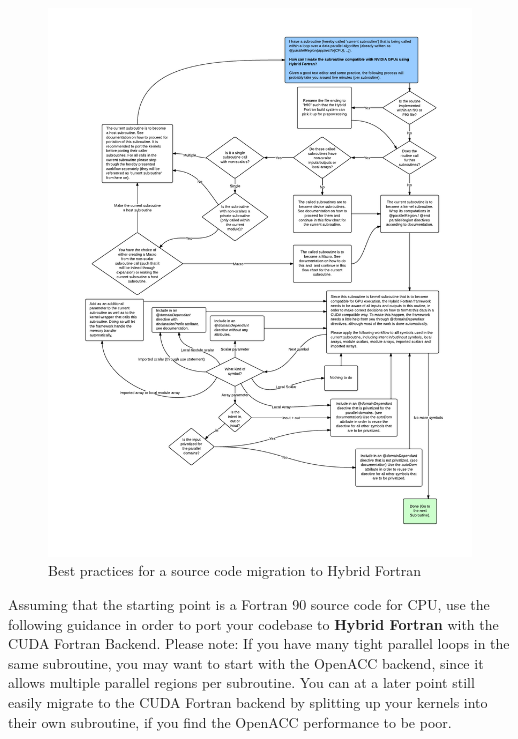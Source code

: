 {\begin{figure}[hbtp]
  \centering  \includegraphics[width=16cm]{figures/HybridFortranGPUCompatibleCode.pdf}
  \caption [Best practices source code migration]{Best practices for a source code migration to Hybrid Fortran}
  \label{figure:bestPractMigration}
\end{figure}

Assuming that the starting point is a Fortran 90 source code for CPU, use the following guidance in order to port your codebase to \textbf{Hybrid Fortran} with the CUDA Fortran Backend. Please note: If you have many tight parallel loops in the same subroutine, you may want to start with the OpenACC backend, since it allows multiple parallel regions per subroutine. You can at a later point still easily migrate to the CUDA Fortran backend by splitting up your kernels into their own subroutine, if you find the OpenACC performance to be poor.

}
